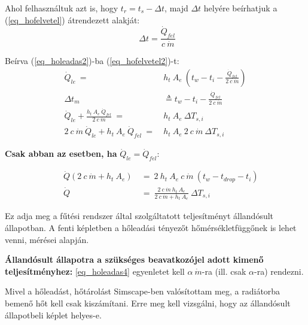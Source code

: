 Ahol felhasználtuk azt is, hogy $t_r = t_s-\Delta t$, majd $\Delta t$ helyére beírhatjuk a (\ref{eq_hofelvetel})  átrendezett alakját:
\begin{equation} \label{eq_hofelvetel2}
~~\Delta t = \frac{\dot Q_{fel}}{c ~ \dot{m}}
\end{equation}

Beírva (\ref{eq_holeadas2})-ba (\ref{eq_hofelvetel2})-t:
\begin{equation} \label{holeadas3}
\begin{aligned}
\dot Q_{le} ~=~ & h_t ~ A_e ~ \left( t_w-t_i-\frac{\dot Q_{fel}}{2~c ~ \dot{m}}\right)  \\[18pt]
\Delta t_m &\triangleq  t_w-t_i-\frac{\dot Q_{fel}}{2~c ~ \dot{m}}
\\[18pt]
\dot Q_{le} + \frac{h_t ~ A_e ~ \dot Q_{fel}}{2 ~ c ~ \dot{m}} ~ = ~ & h_t ~ A_e ~\Delta T_{s,i} \\[24pt]
2 ~ c ~ \dot{m} ~ \dot Q_{le} + h_t ~ A_e ~ \dot Q_{fel} ~ = ~ &  h_t ~ A_e ~ 2~ c~ \dot{m} ~\Delta T_{s,i}
\end{aligned}
\end{equation}

\textbf{Csak abban az esetben, ha} $\dot Q_{le}=\dot Q_{fel}$:



\begin{equation} \label{eq_holeadas4}
\begin{aligned}
~~~~~~\dot Q (2 ~ c ~ \dot{m} + h_t ~ A_e) & ~=~ 2 ~ h_t ~ A_e ~ c~ \dot{m} ~(t_w-t_{drop}-t_i) \\[18pt]
~~~~~~\dot Q &~=~ \frac{2~c~\dot{m}~h_t~A_e}{2 ~c ~ \dot{m} + h_t ~ A_e}~\Delta T_{s,i}
\end{aligned}
\end{equation}

Ez adja meg a fűtési rendszer által szolgáltatott teljesítményt állandósult állapotban.
A fenti képletben a hőleadási tényezőt hőmérsékletfüggőnek is lehet venni, \cite{CHOLEWA2013599} mérései alapján.

\textbf{Állandósult állapotra a szükséges beavatkozójel adott kimenő teljesítményhez:} \ref{eq_holeadas4} egyenletet kell $\alpha~\dot{m}$-ra (ill. csak $\alpha$-ra) rendezni.

Mivel a hőleadást, hőtárolást Simscape-ben valósítottam meg, a radiátorba bemenő hőt kell csak kiszámítani. Erre meg kell vizsgálni, hogy az állandósult állapotbeli képlet helyes-e.

